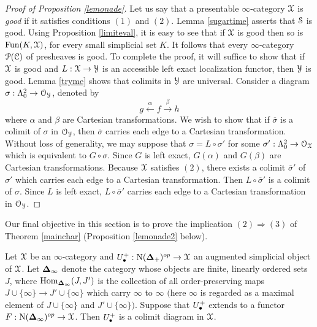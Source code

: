 \begin{proof}[Proof of Proposition \ref{lemonade}]
Let us say that a presentable $\infty$-category $\operatorname{\mathcal{X}}$ is {\em good} if it satisfies conditions $(1)$ and $(2)$.
Lemma \ref{sugartime} asserts that $\operatorname{\mathcal{S}}$ is good. Using Proposition \ref{limiteval}, it is easy to see that if $\operatorname{\mathcal{X}}$ is good then so is $\operatorname{Fun}(K,\operatorname{\mathcal{X}})$, for every small simplicial set $K$. It follows that
every $\infty$-category $\operatorname{\mathcal{P}}(\operatorname{\mathcal{C}})$ of presheaves is good. To complete the proof, it will suffice to show that if $\operatorname{\mathcal{X}}$ is good and $L: \operatorname{\mathcal{X}} \rightarrow \operatorname{\mathcal{Y}}$ is an accessible left exact localization functor, then $\operatorname{\mathcal{Y}}$ is good. Lemma \ref{tryme} shows that colimits in $\operatorname{\mathcal{Y}}$ are universal. 
Consider a diagram $\sigma: \Lambda^2_0 \rightarrow \operatorname{\mathcal{O}}_{\operatorname{\mathcal{Y}}}$, denoted by 
$$ g \stackrel{\alpha}{\leftarrow} f \stackrel{\beta}{\rightarrow} h$$
where $\alpha$ and $\beta$ are Cartesian transformations. We wish to show that if
$\overline{\sigma}$ is a colimit of $\sigma$ in $\operatorname{\mathcal{O}}_{\operatorname{\mathcal{Y}}}$, then $\overline{\sigma}$ carries
each edge to a Cartesian transformation. Without loss of generality, we may suppose that
$\sigma = L \circ \sigma'$ for some $\sigma': \Lambda^2_0 \rightarrow \operatorname{\mathcal{O}}_{\operatorname{\mathcal{X}}}$ which
is equivalent to $G \circ \sigma$. Since $G$ is left exact, $G(\alpha)$ and $G(\beta)$ are
Cartesian transformations. Because $\operatorname{\mathcal{X}}$
satisfies $(2)$, there exists a colimit $\overline{\sigma}'$ of $\sigma'$ which carries each edge to a Cartesian transformation. Then $L \circ \overline{\sigma}'$ is a colimit of $\sigma$. Since $L$ is left exact, $L \circ \overline{\sigma}'$ carries each edge to a Cartesian transformation in 
$\operatorname{\mathcal{O}}_{\operatorname{\mathcal{Y}}}$. 
\end{proof}

Our final objective in this section is to prove the implication $(2) \Rightarrow (3)$ of Theorem \ref{mainchar} (Proposition \ref{lemonade2} below). 

\begin{lemma}\label{aclock}
Let $\operatorname{\mathcal{X}}$ be an $\infty$-category and $U^{+}_{\bullet}: \operatorname{N}(\operatorname{{\bf \Delta}}_{+})^{op} \rightarrow \operatorname{\mathcal{X}}$
an augmented simplicial object of $\operatorname{\mathcal{X}}$. Let $\operatorname{{\bf \Delta}}_{\infty}$ denote the category
whose objects are finite, linearly ordered sets $J$, where $\operatorname{Hom}_{\operatorname{{\bf \Delta}}_{\infty}}(J,J')$ is the collection of all order-preserving maps $J \cup \{\infty\} \rightarrow J' \cup \{\infty\}$ which carry $\infty$ to $\infty$ $($here $\infty$ is regarded as a maximal element of $J \cup \{ \infty \}$ and
$J' \cup \{\infty\}${}$)$. Suppose that $U^{+}_{\bullet}$ extends to a functor
$F: \operatorname{N}(\operatorname{{\bf \Delta}}_{\infty})^{op} \rightarrow \operatorname{\mathcal{X}}$. Then $U^{+}_{\bullet}$ is a colimit diagram in $\operatorname{\mathcal{X}}$.
\end{lemma}

